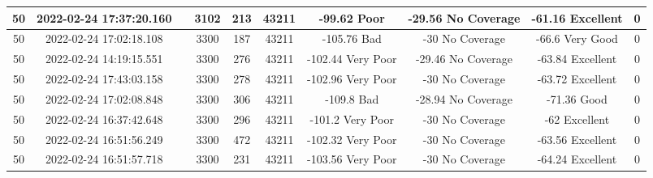 \begin{longtable*}{|c|c|c|c|c|c|c|c|c|c|}
50&2022-02-24 17:37:20.160&&3102&213&43211& -99.62    Poor        & -29.56    No Coverage & -61.16    Excellent   & 0\\\hline
{}50&2022-02-24 17:02:18.108&&3300&187&43211& -105.76   Bad         & -30       No Coverage & -66.6     Very Good   & 0\\\hline
{}50&2022-02-24 14:19:15.551&&3300&276&43211& -102.44   Very Poor   & -29.46    No Coverage & -63.84    Excellent   & 0\\\hline
{}50&2022-02-24 17:43:03.158&&3300&278&43211& -102.96   Very Poor   & -30       No Coverage & -63.72    Excellent   & 0\\\hline
{}50&2022-02-24 17:02:08.848&&3300&306&43211& -109.8    Bad         & -28.94    No Coverage & -71.36    Good        & 0\\\hline
{}50&2022-02-24 16:37:42.648&&3300&296&43211& -101.2    Very Poor   & -30       No Coverage & -62       Excellent   & 0\\\hline
{}50&2022-02-24 16:51:56.249&&3300&472&43211& -102.32   Very Poor   & -30       No Coverage & -63.56    Excellent   & 0\\\hline
{}50&2022-02-24 16:51:57.718&&3300&231&43211& -103.56   Very Poor   & -30       No Coverage & -64.24    Excellent   & 0\\\hline

\end{longtable*}

